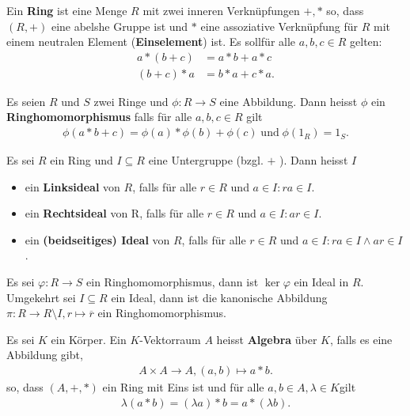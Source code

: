 \documentclass[../Algebra_script.tex]{subfiles}
\begin{document}
    \begin{definition}
        Ein \textbf{Ring} ist eine Menge $R$ mit zwei inneren Verknüpfungen $+, *$ so, dass $(R, +)$ eine abelshe Gruppe ist und $*$ eine assoziative
        Verknüpfung für $R$ mit einem neutralen Element (\textbf{Einselement}) ist. Es sollfür alle $a, b, c \in R$ gelten:
        \begin{align*}
            a*(b+c) &= a*b + a*c \\
            (b + c)*a &= b*a + c*a
        .\end{align*}
    \end{definition}

    \begin{definition}
        Es seien $R$ und $S$ zwei Ringe und $\phi : R \to S$ eine Abbildung. Dann heisst $\phi$ ein \textbf{Ringhomomorphismus} falls für alle $a, b, c \in R$
        gilt
        \begin{align*}
            \phi(a*b + c) = \phi(a)*\phi(b) + \phi(c) \; \text{und} \; \phi(1_{R}) = 1_{S}
        .\end{align*}
    \end{definition}

    \begin{definition}[Ideal]
        Es sei $R$ ein Ring und $I \subseteq R$ eine Untergruppe (bzgl. $+$ ). Dann heisst $I$ 
        \begin{itemize}
            \item ein \textbf{Linksideal} von $R$, falls für alle $r \in R$ und $a\in I: ra \in I$.
            \item ein \textbf{Rechtsideal} von R, falls für alle $r \in R$ und $a \in I: ar \in I$.
            \item ein \textbf{(beidseitiges) Ideal} von $R$, falls für alle $r \in R$ und $a \in I: ra \in I \wedge ar \in I$.
        \end{itemize}
    \end{definition}

    \begin{proposition}
        Es sei $\varphi: R \to S$ ein Ringhomomorphismus, dann ist $\ker \varphi$ ein Ideal in $R$. Umgekehrt sei $I \subseteq R$ ein Ideal, dann ist die
        kanonische Abbildung $\pi: R \to R\setminus I, r\mapsto \overline{r}$ ein Ringhomomorphismus.
    \end{proposition}

    \begin{definition}[Algebra]
        Es sei $K$ ein Körper. Ein $K$-Vektorraum $A$ heisst \textbf{Algebra} über $K$, falls es eine Abbildung gibt,
        \begin{align*}
            A \times A \to A, (a, b) \mapsto a*b
        .\end{align*}
        so, dass $(A, +, *)$ ein Ring mit Eins ist und für alle  $a,b \in A, \lambda \in K$gilt
        \begin{align*}
            \lambda(a*b) = (\lambda a)*b = a*(\lambda b)
        .\end{align*}
    \end{definition}
\end{document}
